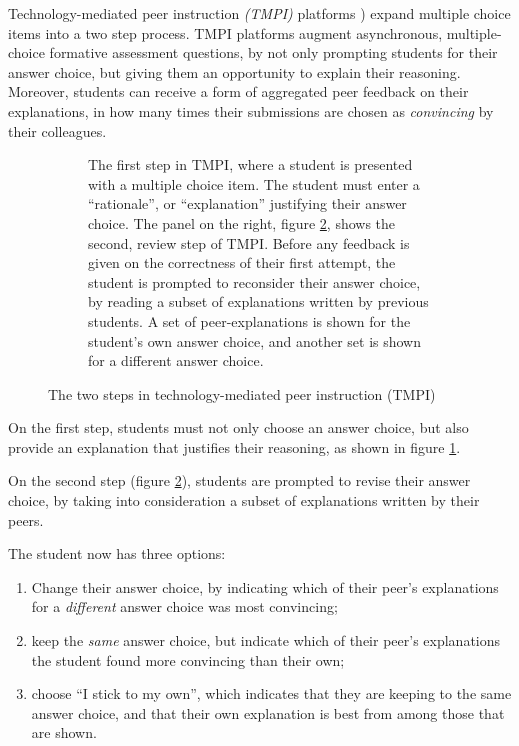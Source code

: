 \documentclass[notitlepage,12pt]{jedm}
\begin{document}
Technology-mediated peer instruction \textit{(TMPI)} platforms 
\cite{charles_harnessing_2019,university_of_british_columbia_ubc/ubcpi_2019})
expand multiple choice items into a two step process.
TMPI platforms augment asynchronous, multiple-choice formative assessment 
questions, by not only prompting students for their answer choice, but giving 
them an opportunity to explain their reasoning.
Moreover, students can receive a form of aggregated peer feedback on their 
explanations, in how many times their submissions are chosen as 
\textit{convincing} by their colleagues.

\begin{figure}
	\begin{subfigure}[b]{0.4\textwidth}
		\def\svgscale{0.50}
		
		\caption{
			The first step in TMPI, where a student is presented with a 
			multiple choice item. The student must enter a ``rationale'', or 
			``explanation'' justifying their answer choice.
			\newline
			\newline
			The panel on the right, figure \protect\ref{fig:question_review}, 
			shows the second, review step of TMPI.
			Before any feedback is given on the correctness of their first 
			attempt, the student is prompted to reconsider their answer choice, 
			by reading a subset of explanations written by previous students.
			A set of peer-explanations is shown for the student's own answer 
			choice, and another set is shown for a different answer choice. 
		}
		\label{fig:question_start}
	\end{subfigure}
	\qquad
	\begin{subfigure}[b]{0.6\textwidth}
		\def\svgscale{0.50}
		
		\caption{}
		\label{fig:question_review}
	\end{subfigure}
	\caption{The two steps in technology-mediated peer 
		instruction (TMPI)}
	\label{fig:tmpi}
\end{figure}

On the first step, students must not only choose an answer choice, but also 
provide an explanation that justifies their reasoning, as shown in figure 
\ref{fig:question_start}.

On the second step (figure \ref{fig:question_review}), students are prompted to 
revise their answer choice, by taking into consideration a subset of 
explanations written by their peers.


The student now has three options:
\begin{enumerate}
	\item Change their answer choice, by indicating which of their peer's 
	explanations for a \textit{different} answer choice was most convincing;
	\item keep the \textit{same} answer choice, but indicate which of their 
	peer's explanations the student found more convincing than their own;
	\item choose ``I stick to my own'', which indicates that they are keeping 
	to the same answer choice, and that their own explanation is best from 
	among those that are shown.
\end{enumerate}
\end{document}
